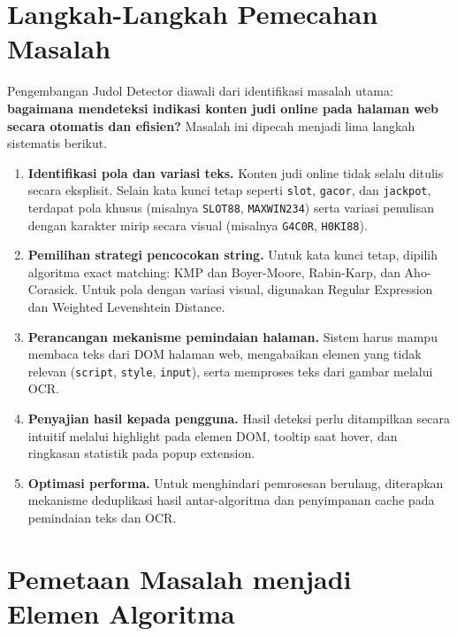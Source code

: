 \section{Langkah-Langkah Pemecahan Masalah}

Pengembangan Judol Detector diawali dari identifikasi masalah utama:
\textbf{bagaimana mendeteksi indikasi konten judi online pada halaman web
secara otomatis dan efisien?} Masalah ini dipecah menjadi lima langkah
sistematis berikut.

\begin{enumerate}
    \item \textbf{Identifikasi pola dan variasi teks.}
    Konten judi online tidak selalu ditulis secara eksplisit. Selain kata
    kunci tetap seperti \texttt{slot}, \texttt{gacor}, dan \texttt{jackpot},
    terdapat pola khusus (misalnya \texttt{SLOT88}, \texttt{MAXWIN234}) serta
    variasi penulisan dengan karakter mirip secara visual (misalnya
    \texttt{G4C0R}, \texttt{H0KI88}).

    \item \textbf{Pemilihan strategi pencocokan string.}
    Untuk kata kunci tetap, dipilih algoritma exact matching: KMP dan
    Boyer-Moore, Rabin-Karp, dan Aho-Corasick. Untuk pola dengan variasi visual, digunakan Regular Expression
    dan Weighted Levenshtein Distance.

    \item \textbf{Perancangan mekanisme pemindaian halaman.}
    Sistem harus mampu membaca teks dari DOM halaman web, mengabaikan elemen
    yang tidak relevan (\texttt{script}, \texttt{style}, \texttt{input}), serta
    memproses teks dari gambar melalui OCR.

    \item \textbf{Penyajian hasil kepada pengguna.}
    Hasil deteksi perlu ditampilkan secara intuitif melalui highlight pada
    elemen DOM, tooltip saat hover, dan ringkasan statistik pada popup
    extension.

    \item \textbf{Optimasi performa.}
    Untuk menghindari pemrosesan berulang, diterapkan mekanisme deduplikasi
    hasil antar-algoritma dan penyimpanan cache pada pemindaian teks dan OCR.
\end{enumerate}

\section{Pemetaan Masalah menjadi Elemen Algoritma}

